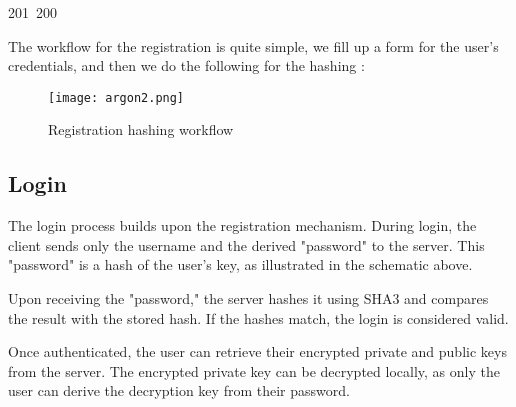 201~200~\documentclass{article}
\begin{document}
	                                                                                The workflow for the registration is quite simple, we fill up a form for the user's credentials, and then we do the following for the hashing :  

	                                                                                \begin{figure}[h]
	                                                                                    \centering
	                                                                                        \texttt{[image: argon2.png]}
	                                                                                            \caption{Registration hashing workflow}
	                                                                                                \label{fig:enter-label}
	                                                                                                \end{figure}

	                                                                                                \clearpage

	                                                                                                \subsection{Login}

	                                                                                                The login process builds upon the registration mechanism. During login, the client sends only the username and the derived "password" to the server. This "password" is a hash of the user's key, as illustrated in the schematic above.

	                                                                                                Upon receiving the "password," the server hashes it using SHA3 and compares the result with the stored hash. If the hashes match, the login is considered valid.

	                                                                                                Once authenticated, the user can retrieve their encrypted private and public keys from the server. The encrypted private key can be decrypted locally, as only the user can derive the decryption key from their password.
\end{document}
